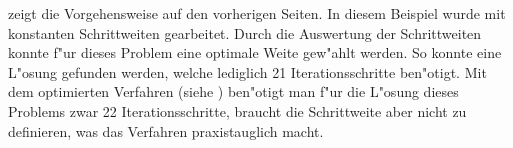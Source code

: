  zeigt die Vorgehensweise auf den vorherigen
Seiten. In diesem Beispiel wurde mit konstanten Schrittweiten
gearbeitet. Durch die Auswertung der Schrittweiten konnte f"ur dieses
Problem eine optimale Weite gew"ahlt werden. So konnte eine L"osung
gefunden werden, welche lediglich 21 Iterationsschritte ben"otigt.
Mit dem optimierten Verfahren (siehe ) ben"otigt man
f"ur die L"osung dieses Problems zwar 22 Iterationsschritte, braucht die
Schrittweite aber nicht zu definieren, was das Verfahren praxistauglich
macht.
